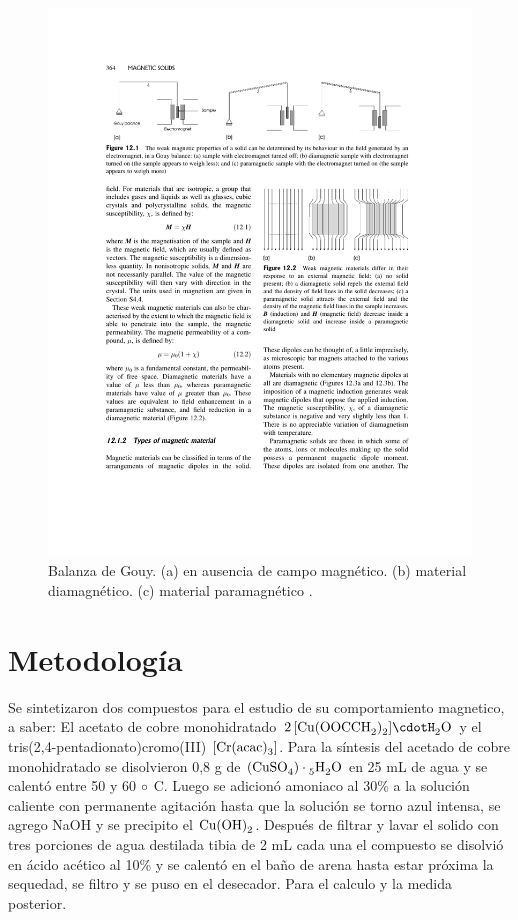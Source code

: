 \documentclass[fleqn,10pt]{SelfArx} %
\begin{document}
	\begin{figure}[h]
        \centering
        \includegraphics[width=\linewidth]{images/Gouy_balance.pdf}
        \caption{Balanza de Gouy.  (a) en ausencia de campo magn\'etico. (b) material diamagn\'etico. (c) material paramagn\'etico \cite{Materials}.}
        \label{fig: Gouy}
    \end{figure}
    
	\section{Metodolog\'ia}
	Se sintetizaron dos compuestos para el estudio de su comportamiento magnetico, a saber: El acetato de cobre monohidratado $\ce{2[Cu(OOCCH_{2})_{2}]\cdotH_{2}O}$ y el tris(2,4-pentadionato)cromo(III) $\ce{[Cr(acac)_{3}]}$. Para la síntesis del acetado de cobre monohidratado se disolvieron 0,8 g de $\ce{(CuSO_{4})\cdot 5H_{2}O}$ en 25 mL de agua y se calentó entre 50 y 60 $\ce{\circ}$ C. Luego se adicionó amoniaco al 30\% a la solución caliente con permanente agitación hasta que la solución se torno azul intensa, se agrego NaOH y se precipito el $\ce{Cu(OH)_{2}}$. Después de filtrar y lavar el solido con tres porciones de agua destilada tibia de 2 mL cada una el compuesto se disolvió en ácido acético al 10\% y se calentó en el baño de arena hasta estar próxima la sequedad, se filtro y se puso en el desecador. Para el calculo y la medida posterior. 
	
\end{document}
